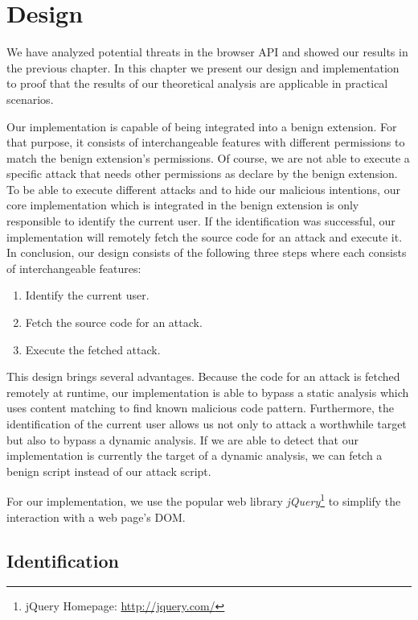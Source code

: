 
\chapter{Design}

	We have analyzed potential threats in the browser API and showed our results in the previous chapter. In this chapter we present our design and implementation to proof that the results of our theoretical analysis are applicable in practical scenarios. 
	
	Our implementation is capable of being integrated into a benign extension. For that purpose, it consists of interchangeable features with different permissions to match the benign extension's permissions. Of course, we are not able to execute a specific attack that needs other permissions as declare by the benign extension. To be able to execute different attacks and to hide our malicious intentions, our core implementation which is integrated in the benign extension is only responsible to identify the current user. If the identification was successful, our implementation will remotely fetch the source code for an attack and execute it. In conclusion, our design consists of the following three steps where each consists of interchangeable features:
	
	\begin{enumerate}
		\item Identify the current user.
		\item Fetch the source code for an attack.
		\item Execute the fetched attack.
	\end{enumerate}
	
	This design brings several advantages. Because the code for an attack is fetched remotely at runtime, our implementation is able to bypass a static analysis which uses content matching to find known malicious code pattern. Furthermore, the identification of the current user allows us not only to attack a worthwhile target but also to bypass a dynamic analysis. If we are able to detect that our implementation is currently the target of a dynamic analysis, we can fetch a benign script instead of our attack script. 

	For our implementation, we use the popular web library \textit{jQuery}\footnote{jQuery Homepage: \url{http://jquery.com/}} to simplify the interaction with a web page's DOM. 

\newpage	
\section{Identification}

